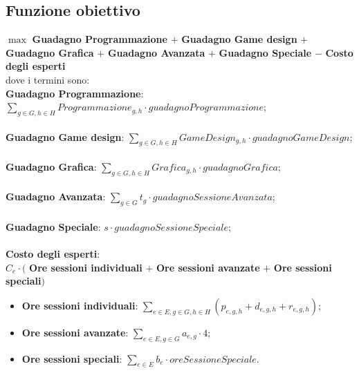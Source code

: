 \documentclass[12pt]{article}
\begin{document}
   \subsection{Funzione obiettivo}
    $\max$ \textbf{Guadagno Programmazione} $+$ \textbf{Guadagno Game design} $+$ \textbf{Guadagno Grafica} $+$      \textbf{Guadagno Avanzata} $+$ \textbf{Guadagno Speciale} $-$ \textbf{Costo degli esperti}\\
    \newline
   dove i termini sono:\\
    \textbf{Guadagno Programmazione}: $\sum_{g \in G, h \in H} Programmazione_{g,h} \cdot guadagnoProgrammazione$;\\ \\
    \textbf{Guadagno Game design}: $\sum_{g \in G, h \in H} GameDesign_{g,h} \cdot guadagnoGameDesign$;\\ \\
    \textbf{Guadagno Grafica}: $\sum_{g \in G, h \in H} Grafica_{g,h} \cdot guadagnoGrafica$;\\ \\
    \textbf{Guadagno Avanzata}: $\sum_{g \in G} t_g \cdot guadagnoSessioneAvanzata$;\\ \\
    \textbf{Guadagno Speciale}: $s \cdot guadagnoSessioneSpeciale$;\\ \\
    \textbf{Costo degli esperti}:\\ $C_e \cdot ($ \textbf{Ore sessioni individuali} $+$ \textbf{Ore sessioni avanzate} $+$ \textbf{Ore sessioni speciali}$)$\\
    \begin{itemize}
        \item \textbf{Ore sessioni individuali}: $\sum_{e \in E, g \in G, h \in H} (p_{e,g,h} + d_{e,g,h} + r_{e,g,h})$;
        \item \textbf{Ore sessioni avanzate}: $\sum_{e \in E, g \in G} a_{e,g} \cdot 4$;
        \item \textbf{Ore sessioni speciali}: $\sum_{e \in E} b_{e} \cdot oreSessioneSpeciale$.
    \end{itemize}
\end{document}
